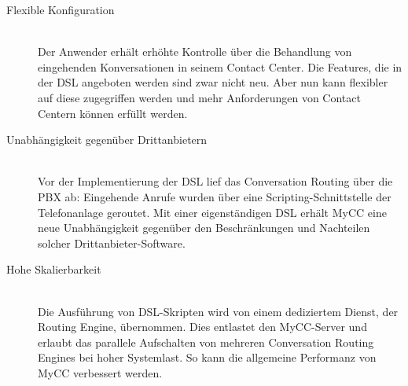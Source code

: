 \begin{description}
\item[Flexible Konfiguration] \hfill \\
Der Anwender erhält erhöhte Kontrolle über die Behandlung von eingehenden Konversationen in seinem Contact Center. Die Features, die in der DSL angeboten werden sind zwar nicht neu. Aber nun kann flexibler auf diese zugegriffen werden und mehr Anforderungen von Contact Centern können erfüllt werden.
\item[Unabhängigkeit gegenüber Drittanbietern] \hfill \\
Vor der Implementierung der DSL lief das Conversation Routing über die PBX ab: Eingehende Anrufe wurden über eine Scripting-Schnittstelle der Telefonanlage geroutet. Mit einer eigenständigen DSL erhält MyCC eine neue Unabhängigkeit gegenüber den Beschränkungen und Nachteilen solcher Drittanbieter-Software.
\item[Hohe Skalierbarkeit] \hfill \\
Die Ausführung von DSL-Skripten wird von einem dediziertem Dienst, der Routing Engine, übernommen. Dies entlastet den MyCC-Server und erlaubt das parallele Aufschalten von mehreren Conversation Routing Engines bei hoher Systemlast. So kann die allgemeine Performanz von MyCC verbessert werden.
\end{description}

